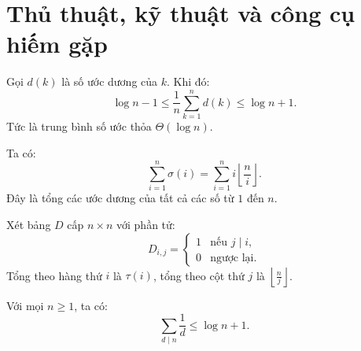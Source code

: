 \documentclass[../imo-training-open-book.tex]{subfiles}
\begin{document}
\newpage

\section{Thủ thuật, kỹ thuật và công cụ hiếm gặp}

\begin{theorem}
    \label{theorem:average-tau}
    Gọi \( d(k) \) là số ước dương của \( k \). Khi đó:
    \[
        \log n - 1 \le \frac{1}{n} \sum_{k=1}^n d(k) \le \log n + 1.
    \]
    Tức là trung bình số ước thỏa \( \Theta(\log n) \).
\end{theorem}

\vspace{1em}

\begin{theorem}
    \label{theorem:sum-of-divisors-table}
    Ta có:
    \[
        \sum_{i=1}^{n} \sigma(i) = \sum_{i=1}^{n} i \left\lfloor \frac{n}{i} \right\rfloor.
    \]
    Đây là tổng các ước dương của tất cả các số từ \( 1 \) đến \( n \).
\end{theorem}

\vspace{1em}

\begin{theorem}
    \label{theorem:divisor-matrix}
    Xét bảng \( D \) cấp \( n \times n \) với phần tử:
    \[
        D_{i,j} = 
        \begin{cases}
            1 & \text{nếu } j \mid i, \\
            0 & \text{ngược lại}.
        \end{cases}
    \]
    Tổng theo hàng thứ \( i \) là \( \tau(i) \), tổng theo cột thứ \( j \) là \( \left\lfloor \frac{n}{j} \right\rfloor \).
\end{theorem}

\vspace{1em}

\begin{theorem}
    \label{theorem:sum-of-divisors-harmonic}
    Với mọi \( n \ge 1 \), ta có:
    \[
        \sum_{d \mid n} \frac{1}{d} \le \log n + 1.
    \]
\end{theorem}
\end{document}
